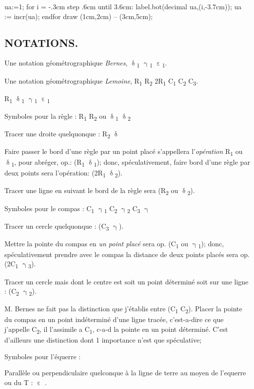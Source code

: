 \documentclass[12pt,a4paper,twocolumn]{book} %
\newcommand{\Ra}[1]{\textcolor{rtLightBlue900}R\textsubscript{\textcolor{rtLightBlue900}{#1}}}
\newcommand{\Rab}[1]{\small{\textcolor{rtLightBlue900}{2}}\textcolor{rtLightBlue900}R\textsubscript{\textcolor{rtLightBlue900}{#1}}}
\newcommand{\gd}[1]{\textbf{$\updelta$}\textsubscript{#1}}
\newcommand{\gc}[1]{\textbf{$\upgamma$}\textsubscript{#1}}
\newcommand{\gq}[1]{\textbf{$\upepsilon$}\textsubscript{#1}}
\newcommand{\Ca}[1]{\textcolor{rtLightBlue900}C\textsubscript{\textcolor{rtLightBlue900}{#1}}}
\begin{document}
\begin{mpdisplay}
ua:=1;
for i = -.3cm step .6cm until 3.6cm:
    label.bot(decimal ua,(i,-3.7cm));
    ua := incr(ua);
endfor
  draw (1cm,2cm) -- (3cm,5cm);
\end{mpdisplay}


\subsection{NOTATIONS.}

Une notation géométrographique \emph{Bernes},  \gd{1} \gc{1} \gq{1}.

Une notation géométrographique \emph{Lemoine}, \Ra{1} \Ra{2} \Rab{1} \Ca{1} \Ca{2} \Ca{3}.


\Ra{1} \gd{1} \gc{1} \gq{1}

Symboles pour la règle : \Ra{1} \Ra{2} ou \gd{1} \gd{2}

Tracer une droite quelquonque : \Ra{2}  \gd{}

Faire passer le bord d'une règle par un point placé s'appellera l'\emph{opération} \Ra{1} ou \gd{1}, pour abréger, op.: (\Ra{1} \gd{1}); donc, spéculativement, faire bord d'une règle par deux points sera l'opération: (\Rab{1}  \gd{2}).


Tracer une ligne en suivant le bord de la règle sera (\Ra{2} ou \gd{2}).

Symboles pour le compas : \Ca{1} \gc{1} \Ca{2} \gc{2} \Ca{3}  \gc{}

Tracer un cercle quelquonque : (\Ca{3} \gc{}).


Mettre la pointe du compas en \emph{un point placé} sera op. (\Ca{1} ou \gc{1}); donc, spéculativement prendre avec le compas la distance de deux points placés sera op. (2\Ca{1} \gc{3}).

Tracer un cercle mais dont le centre est soit un point déterminé soit sur une ligne  : (\Ca{2} \gc{2}).




M. Bernes ne fait pas la distinction que j'établis entre (\Ca{1} \Ca{2}). Placer la pointe du compas en un point indéterminé d'une ligne tracée, c'est-a-dire ce que j'appelle \Ca{2}, il l'assimile a
\Ca{1}, c-a-d la pointe en un point déterminé. C'est d'ailleurs
une distinction dont 1 importance n'est que spéculative;


Symboles pour l'équerre :

Parallèle ou perpendiculaire quelconque à la ligne de terre au moyen de l'equerre ou du T : \gq{} .
\end{document}
